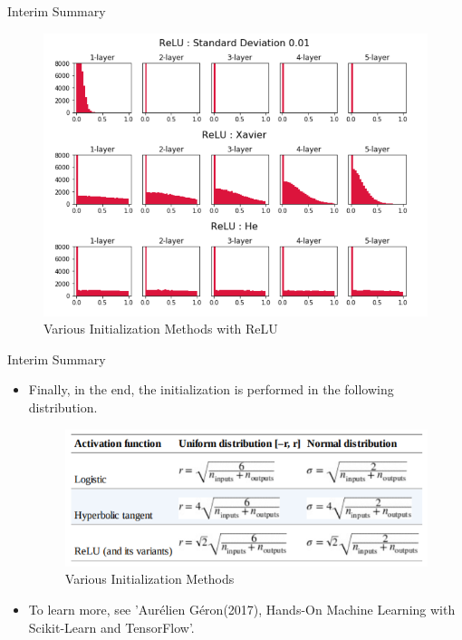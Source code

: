 \documentclass{beamer}
\begin{document}
	\begin{frame}{Interim Summary}
		\begin{figure}[h]
			\centering
			\includegraphics[scale=0.6]{./cnn/cnn_relu.PNG}	
			\caption{Various Initialization Methods with ReLU}
			\label{fig:cnnrelu}	
		\end{figure}
	\end{frame}


	\begin{frame}{Interim Summary}
		\begin{itemize}
			\item Finally, in the end, the initialization is performed in the following distribution.
			\vspace{10pt}
			\begin{figure}[h]
				\centering
				\includegraphics[scale=0.6]{./etc/init.PNG}	
				\caption{Various Initialization Methods}
				\label{fig:initialzing}	
			\end{figure}
			\item To learn more, see 'Aurélien Géron(2017), Hands-On Machine Learning with Scikit-Learn and TensorFlow'.
		\end{itemize}
	\end{frame}
\end{document}

